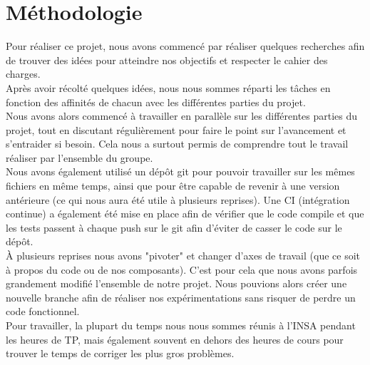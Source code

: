 \chapter{Méthodologie}
    Pour réaliser ce projet, nous avons commencé par réaliser quelques recherches afin de trouver des idées pour atteindre nos objectifs et respecter le cahier des charges.
    \\
    Après avoir récolté quelques idées, nous nous sommes réparti les tâches en fonction des affinités de chacun avec les différentes parties du projet.
    \\
    Nous avons alors commencé à travailler en parallèle sur les différentes parties du projet, tout en discutant régulièrement pour faire le point sur l'avancement et s'entraider si besoin. Cela nous a surtout permis de comprendre tout le travail réaliser par l'ensemble du groupe.
    \\
    Nous avons également utilisé un dépôt git pour pouvoir travailler sur les mêmes fichiers en même temps, ainsi que pour être capable de revenir à une version antérieure (ce qui nous aura été utile à plusieurs reprises).
    Une CI (intégration continue) a également été mise en place afin de vérifier que le code compile et que les tests passent à chaque push sur le git afin d'éviter de casser le code sur le dépôt.
    \\
    À plusieurs reprises nous avons "pivoter" et changer d'axes de travail (que ce soit à propos du code ou de nos composants). C'est pour cela que nous avons parfois grandement modifié l'ensemble de notre projet. Nous pouvions alors créer une nouvelle branche afin de réaliser nos expérimentations sans risquer de perdre un code fonctionnel.
    \\
    Pour travailler, la plupart du temps nous nous sommes réunis à l'INSA pendant les heures de TP, mais également souvent en dehors des heures de cours pour trouver le temps de corriger les plus gros problèmes.
    \\

